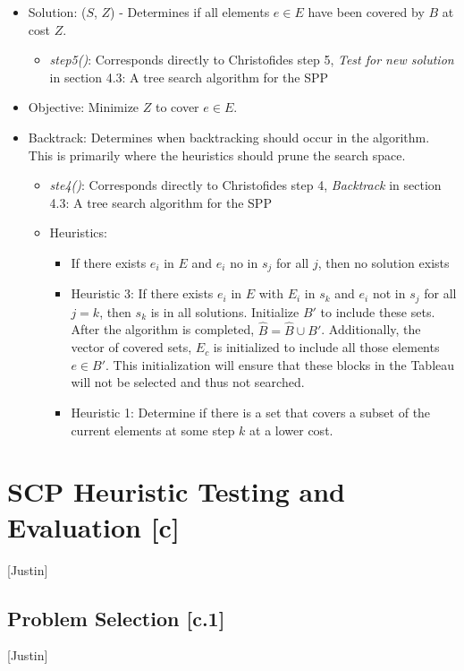 \documentclass[12pt]{article}
\begin{document}
\begin{itemize}
\begin{itemize}
			\end{itemize}
	\item Solution: ($S$, $Z$) - Determines if all elements $e \in E$ have been covered by $B$ at cost $Z$.
			\begin{itemize}
				\item \textit{step5()}: Corresponds directly to Christofides step 5, \textit{Test for new solution} in section 4.3: A tree search algorithm for the SPP
			\end{itemize}
	\item Objective: Minimize $Z$ to cover $e \in E$.
	\item Backtrack: Determines when backtracking should occur in the algorithm. This is primarily where the heuristics should prune the search space.
	\begin{itemize}
		\item \textit{ste4()}: Corresponds directly to Christofides step 4, \textit{Backtrack} in section 4.3: A tree search algorithm for the SPP
		\item Heuristics:
			\begin{itemize}
				\item If there exists $e_i$ in $E$ and $e_i$ no in $s_j$ for all $j$, then no solution exists
				\item Heuristic 3: If there exists $e_i$ in $E$ with $E_i$ in $s_k$ and $e_i$ not in $s_j$ for all $j = k$, then $s_k$ is in all solutions. Initialize $B\prime$ to include these sets. After the algorithm is completed, $\hat{B} = \hat{B} \cup B\prime$. Additionally, the vector of covered sets, $E_c$ is initialized to include all those elements $e \in B\prime$. This initialization will ensure that these blocks in the Tableau will not be selected and thus not searched.
				\item Heuristic 1: Determine if there is a set that covers a subset of the current elements at some step $k$ at a lower cost.
			\end{itemize}
	\end{itemize}
\end{itemize}


\section{SCP Heuristic Testing and Evaluation [c]} \label{scn:design}

[Justin]
\subsection{Problem Selection [c.1]}
[Justin]
\end{document}
